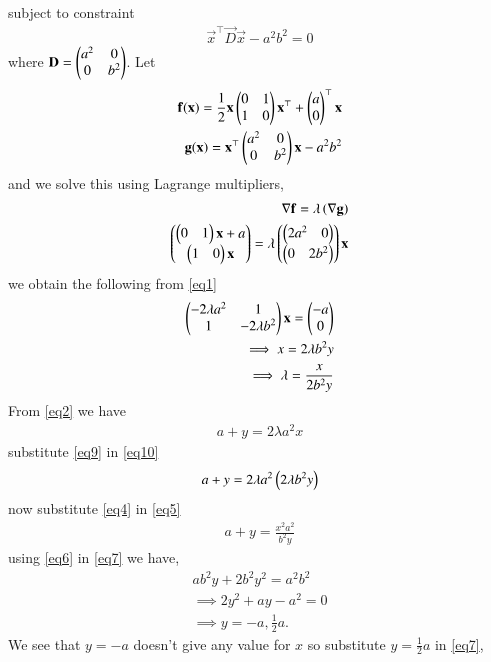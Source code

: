 \documentclass[journal,12pt,twocolumn]{IEEEtran}
\begin{document}
subject to constraint
\begin{align}
    \vec{x}^{\top}\vec{D}\vec{x}-a^2b^2=0 \label{eq6}
\end{align}
where $\mathbf{D}=\begin{pmatrix}a^2 & 0 \\ 0 & b^2\end{pmatrix}$.
Let
\begin{align}
    \mathbf{f(x)}=\frac{1}{2}\mathbf{x}\begin{pmatrix}0&1 \\ 1&0\end{pmatrix}\mathbf{x}^{\top}+ \begin{pmatrix}a \\ 0\end{pmatrix}^{\top}\mathbf{x} \\
    \mathbf{g(x)}=\mathbf{x}^{\top}\begin{pmatrix}a^2 & 0 \\ 0 & b^2\end{pmatrix}\mathbf{x}-a^2b^2
\end{align}
and we solve this using Lagrange multipliers,
\begin{align}
    \nabla \mathbf{f} = \lambda\left(\nabla \mathbf{g}\right) \\ 
    \begin{pmatrix}\begin{pmatrix}0 & 1\end{pmatrix}\mathbf{x}+a \\ \begin{pmatrix}1&0\end{pmatrix}\mathbf{x}\end{pmatrix} = \lambda \begin{pmatrix}\begin{pmatrix}2a^2 & 0\end{pmatrix}\\ \begin{pmatrix}0 & 2b^2\end{pmatrix}\end{pmatrix}\mathbf{x} \label{eq1}
\end{align}
we obtain the following from \eqref{eq1}
\begin{align}
   \begin{pmatrix}-2\lambda a^2 & 1 \\ 1 & -2\lambda b^2\end{pmatrix}\mathbf{x}=\begin{pmatrix}-a \\0\end{pmatrix}  \label{eq2} \\ 
    \implies x = 2\lambda b^2y  \label{eq9} \\
    \implies \lambda = \frac{x}{2b^2y} \label{eq4}
\end{align}
From \eqref{eq2} we have
\begin{align}
    a+y= 2\lambda a^2x \label{eq10}
\end{align}
substitute \eqref{eq9} in \eqref{eq10}
\begin{align}
    a+y = 2\lambda a^2\left(2\lambda b^2y\right) \label{eq5}
\end{align}    
now substitute \eqref{eq4} in \eqref{eq5}
\begin{align}
    a+y = \frac{x^2a^2}{b^2y} \label{eq7}
\end{align}
using \eqref{eq6} in \eqref{eq7} we have,
\begin{align}
  ab^2y+2b^2y^2=a^2b^2 \\
  \implies 2y^2+ay-a^2=0 \\
  \implies y = -a ,\frac{1}{2}a.
\end{align}
We see that $y=-a$ doesn't give any value for $x$ so substitute $y=\frac{1}{2}a$ in \eqref{eq7},
\end{document}
